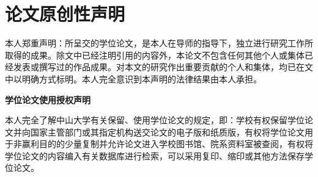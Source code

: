 {\begin{titlepage}
\begin{center}
  \vspace*{21pt}

\kai\sihao{\@cdate}
\end{center}
\end{titlepage}

\newpage
\thispagestyle{empty}
\mbox{}

\clearpage
{}
\chapter*{\centering\sanhao\song\bfseries 论文原创性声明}
\song{}
本人郑重声明：所呈交的学位论文，是本人在导师的指导下，独立进行研究工作所取得的成果。除文中已经注明引用的内容外，本论文不包含任何其他个人或集体已经发表或撰写过的作品成果。对本文的研究作出重要贡献的个人和集体，均已在文中以明确方式标明。本人完全意识到本声明的法律结果由本人承担。

\vspace*{40pt}
\begin{flushright}
\setlength{\@title@width}{5cm}
  {\sihao{}
 }
\end{flushright}

\vspace*{60pt}
\begin{center}
  \sanhao\song\bfseries{学位论文使用授权声明}
\end{center}

\song{}
本人完全了解中山大学有关保留、使用学位论文的规定，即：学校有权保留学位论文并向国家主管部门或其指定机构送交论文的电子版和纸质版，有权将学位论文用于非赢利目的的少量复制并允许论文进入学校图书馆、院系资料室被查阅，有权将学位论文的内容编入有关数据库进行检索，可以采用复印、缩印或其他方法保存学位论文。

\vspace*{40pt}
\begin{center}
\setlength{\@title@width}{5cm}
  {\sihao{}
 }
\end{center}
\thispagestyle{empty}   %

}

